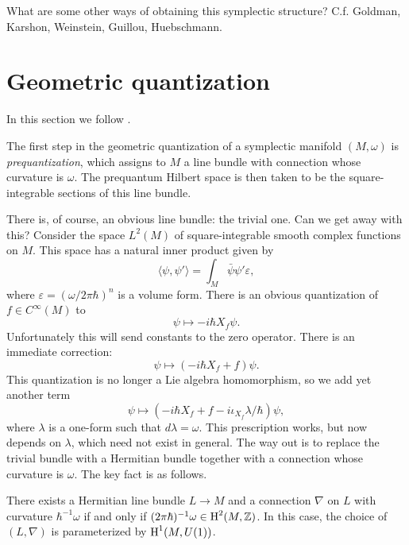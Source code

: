 \documentclass{amsart}
\begin{document}
{\color{red} What are some other ways of obtaining this symplectic structure? C.f. Goldman, Karshon, Weinstein,
Guillou, Huebschmann.}

\section{Geometric quantization}

In this section we follow \cite{wood}.

The first step in the geometric quantization of a symplectic manifold $(M,\omega)$ is \textit{prequantization},
which assigns to $M$ a line bundle with connection whose curvature is $\omega$. The prequantum Hilbert
space is then taken to be the square-integrable sections of this line bundle.

There is, of course, an obvious line bundle: the trivial one. Can we get away with this?
Consider the space $L^2(M)$ of
square-integrable smooth complex functions on $M$. This space has a natural inner product given by
\begin{equation*}
    \langle\psi,\psi'\rangle = \int_M \bar\psi \psi' \varepsilon,
\end{equation*}
where $\varepsilon=(\omega/2\pi\hbar)^n$ is a volume form. There is an obvious quantization of
$f\in C^\infty(M)$ to
\begin{equation*}
    \psi \mapsto -i\hbar X_f\psi.
\end{equation*}
Unfortunately this will send constants to the zero operator. There is an immediate correction:
\begin{equation*}
    \psi \mapsto (-i\hbar X_f + f)\psi.
\end{equation*}
This quantization is no longer a Lie algebra homomorphism, so we add yet another term
\begin{equation*}
    \psi \mapsto (-i\hbar X_f + f -i\iota_{X_f}\lambda/\hbar)\psi,
\end{equation*}
where $\lambda$ is a one-form such that $d\lambda=\omega$. This prescription works, but now
depends on $\lambda$, which need not exist in general. The way out is to replace the
trivial bundle with a Hermitian bundle together with a connection whose curvature is $\omega$.
The key fact is as follows.

\begin{theorem}
    There exists a Hermitian line bundle $L\to M$ and a connection $\nabla$ on $L$ with
    curvature $\hbar^{-1}\omega$ if and only if $(2\pi\hbar)^{-1}\omega\in \operatorname{H}^2(M,\mathbb{Z})$.
    In this case, the choice of $(L,\nabla)$ is parameterized by $\operatorname{H}^1(M,U(1))$.
\end{theorem}
\end{document}
